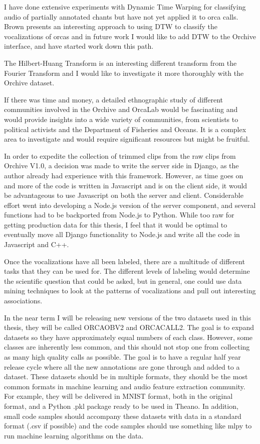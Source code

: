 \documentclass[12pt,oneside]{book}
\begin{document}
I have done extensive experiments with Dynamic Time Warping for
classifying audio of partially annotated chants \cite{ness2008chants}
but have not yet applied it to orca calls.  Brown
\cite{brown2006classifying} presents an interesting approach to using
DTW to classify the vocalizations of orcas and in future work I would
like to add DTW to the Orchive interface, and have started work down
this path.

The Hilbert-Huang Transform \cite{adam2006hilbert} is an interesting
different transform from the Fourier Transform and I would like to
investigate it more thoroughly with the Orchive dataset.

If there was time and money, a detailed ethnographic study of
different communities involved in the Orchive and OrcaLab would be
fascinating and would provide insights into a wide variety of
communities, from scientists to political activists and the Department
of Fisheries and Oceans.  It is a complex area to investigate and
would require significant resources but might be fruitful.

In order to expedite the collection of trimmed clips from the raw
clips from Orchive V1.0, a decision was made to write the server side
in Django, as the author already had experience with this framework.
However, as time goes on and more of the code is written in Javascript
and is on the client side, it would be advantageous to use Javascript
on both the server and client.  Considerable effort went into
developing a Node.js version of the server component, and several
functions had to be backported from Node.js to Python.  While too raw
for getting production data for this thesis, I feel that it would be
optimal to eventually move all Django functionality to Node.js and
write all the code in Javascript and C++.

Once the vocalizations have all been labeled, there are a multitude of
different tasks that they can be used for.  The different levels of
labeling would determine the scientific question that could be asked,
but in general, one could use data mining techniques to look at the
patterns of vocalizations and pull out interesting associations.

In the near term I will be releasing new versions of the two datasets
used in this thesis, they will be called ORCAOBV2 and ORCACALL2.  The
goal is to expand datasets so they have approximately equal numbers of
each class.  However, some classes are inherently less common, and
this should not stop one from collecting as many high quality calls as
possible.  The goal is to have a regular half year release cycle where
all the new annotations are gone through and added to a dataset.
These datasets should be in multiple formats, they should be the most
common formats in machine learning and audio feature extraction
community.  For example, they will be delivered in MNIST format, both
in the original format, and a Python .pkl package ready to be used in
Theano.  In addition, small code samples should accompany these
datasets with data in a standard format (.csv if possible) and the
code samples should use something like mlpy to run machine learning
algorithms on the data.
\end{document}
